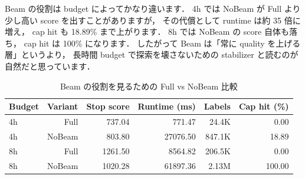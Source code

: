 \documentclass[a4paper,11pt]{article}
\begin{document}
\begin{table}[H]
    \centering
    \small
    \caption{実験2の主 ablation 結果}
\end{table}

Beam の役割は budget によってかなり違います．
4h では NoBeam が Full より少し高い score を出すことがありますが，
その代償として runtime は約 35 倍に増え，
cap hit も 18.89\% まで上がります．
8h では NoBeam の score 自体も落ち，
cap hit は 100\% になります．
したがって Beam は「常に quality を上げる層」というより，
長時間 budget で探索を壊さないための stabilizer と読むのが自然だと思っています．

\begin{table}[H]
    \centering
    \small
    \caption{Beam の役割を見るための Full vs NoBeam 比較}
    \begin{tabular}{lrrrrr}
        \toprule
        Budget & Variant & Stop score & Runtime (ms) & Labels & Cap hit (\%) \\
        \midrule
        4h & Full & 737.04 & 771.47 & 24.4K & 0.00 \\
        4h & NoBeam & 803.80 & 27076.50 & 847.1K & 18.89 \\
        8h & Full & 1261.50 & 8564.82 & 206.5K & 0.00 \\
        8h & NoBeam & 1020.28 & 61897.36 & 2.13M & 100.00 \\
        \bottomrule
    \end{tabular}
\end{table}
\end{document}

